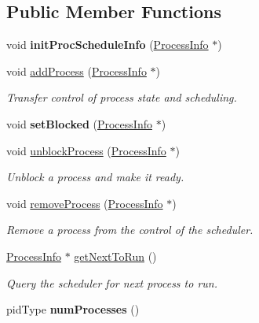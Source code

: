 \subsection*{\-Public \-Member \-Functions}
\begin{DoxyCompactItemize}
\item 
\hypertarget{classcFCFS_aff34f18c6f4c3f38029d904cd2ec55de}{void {\bfseries init\-Proc\-Schedule\-Info} (\hyperlink{structProcessInfo}{\-Process\-Info} $\ast$)}\label{d6/dc3/classcFCFS_aff34f18c6f4c3f38029d904cd2ec55de}

\item 
void \hyperlink{classcFCFS_a25d4bf440041f5294f3b9c5aff20b411}{add\-Process} (\hyperlink{structProcessInfo}{\-Process\-Info} $\ast$)
\begin{DoxyCompactList}\small\item\em \-Transfer control of process state and scheduling. \end{DoxyCompactList}\item 
\hypertarget{classcFCFS_a1b8ee3a759a31032ec7c1cd7b15ed5df}{void {\bfseries set\-Blocked} (\hyperlink{structProcessInfo}{\-Process\-Info} $\ast$)}\label{d6/dc3/classcFCFS_a1b8ee3a759a31032ec7c1cd7b15ed5df}

\item 
void \hyperlink{classcFCFS_a793da0298f9b36ab8505a0e3daaf41ec}{unblock\-Process} (\hyperlink{structProcessInfo}{\-Process\-Info} $\ast$)
\begin{DoxyCompactList}\small\item\em \-Unblock a process and make it ready. \end{DoxyCompactList}\item 
void \hyperlink{classcFCFS_aeeac757885108ae510b728600ebba248}{remove\-Process} (\hyperlink{structProcessInfo}{\-Process\-Info} $\ast$)
\begin{DoxyCompactList}\small\item\em \-Remove a process from the control of the scheduler. \end{DoxyCompactList}\item 
\hyperlink{structProcessInfo}{\-Process\-Info} $\ast$ \hyperlink{classcFCFS_aa2b92a8a992078e499aab455c9d78faf}{get\-Next\-To\-Run} ()
\begin{DoxyCompactList}\small\item\em \-Query the scheduler for next process to run. \end{DoxyCompactList}\item 
\hypertarget{classcFCFS_a0a72de791436a84120a534dd2fa0485d}{pid\-Type {\bfseries num\-Processes} ()}\label{d6/dc3/classcFCFS_a0a72de791436a84120a534dd2fa0485d}

\end{DoxyCompactItemize}
